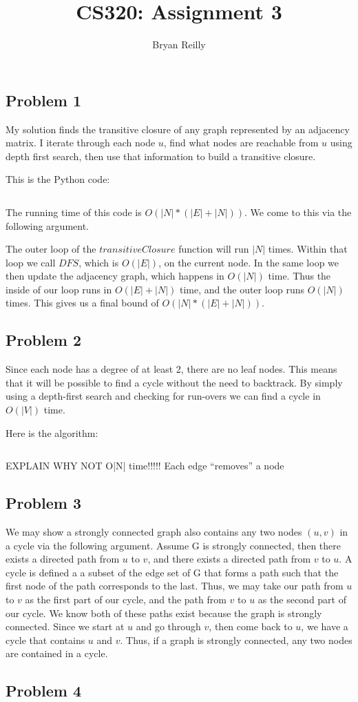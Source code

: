 \documentclass{article}
\author{Bryan Reilly}
\title{CS320: Assignment 3}
\begin{document}
\maketitle{}

\subsection*{Problem 1}
My solution finds the transitive closure of any graph represented by an adjacency matrix.
I iterate through each node $u$,
find what nodes are reachable from $u$ using depth first search,
then use that information to build a transitive closure.

This is the Python code:

\inputminted{python}{q1.py}

The running time of this code is $O( |N| * (|E|+|N|) )$. We come to this via the following argument.

The outer loop of the $transitiveClosure$ function will run $|N|$ times.
Within that loop we call $DFS$, which is $O(|E|)$, on the current node.
In the same loop we then update the adjacency graph, which happens in $O(|N|)$ time.
Thus the inside of our loop runs in $O(|E| + |N|)$ time, and the outer loop runs $O(|N|)$ times.
This gives us a final bound of $O( |N| * (|E|+|N|) )$.


\subsection*{Problem 2}
Since each node has a degree of at least 2, there are no leaf nodes.
This means that it will be possible to find a cycle without the need to backtrack.
By simply using a depth-first search and checking for run-overs we can find a cycle in $O(|V|)$ time.

Here is the algorithm:

\inputminted{python}{q2.py}

EXPLAIN WHY NOT O|N| time!!!!! Each edge ``removes'' a node

\subsection*{Problem 3}
We may show a strongly connected graph also contains any two nodes $(u,v)$ in a cycle
via the following argument.
Assume G is strongly connected, then there exists a directed path from $u$ to $v$,
and there exists a directed path from $v$ to $u$.
A cycle is defined a a subset of the edge set of G that forms a path such that the first node of the path corresponds to the last.
Thus, we may take our path from $u$ to $v$ as the first part of our cycle, and the path from $v$ to $u$ as the second part of our cycle.
We know both of these paths exist because the graph is strongly connected.
Since we start at $u$ and go through $v$, then come back to $u$, we have a cycle that contains $u$ and $v$.
Thus, if a graph is strongly connected, any two nodes are contained in a cycle.

\subsection*{Problem 4}
\end{document}
